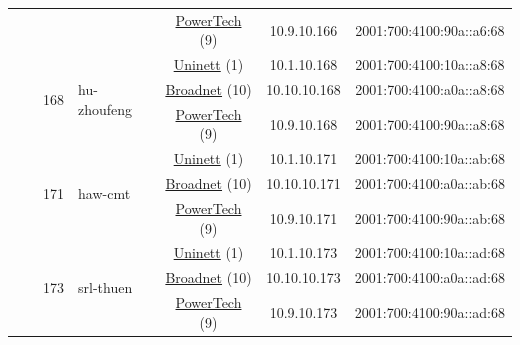 \begin{small}
\begin{center}
\begin{longtable}{|c|c|c|c|c|c|c|c|}
  &  &  &  & \multicolumn{2}{|c|}{\tiny{\href{http://www.powertech.no}{PowerTech} (9)}} & \tiny{10.9.10.166} & \tiny{2001:700:4100:90a::a6:68} \\* \cline{3-3}\cline{4-4}\cline{5-5}\cline{6-6}\cline{7-7}\cline{8-8}
  &  & \multirow{3}{*}{\tiny{168}} & \multicolumn{1}{|l|}{\multirow{3}{*}{\tiny{hu-zhoufeng}}} & \multicolumn{2}{|c|}{\tiny{\href{https://www.uninett.no}{Uninett} (1)}} & \tiny{10.1.10.168} & \tiny{2001:700:4100:10a::a8:68} \\* \cline{5-5}\cline{6-6}\cline{7-7}\cline{8-8}
  &  &  &  & \multicolumn{2}{|c|}{\tiny{\href{https://www.broadnet.no}{Broadnet} (10)}} & \tiny{10.10.10.168} & \tiny{2001:700:4100:a0a::a8:68} \\* \cline{5-5}\cline{6-6}\cline{7-7}\cline{8-8}
  &  &  &  & \multicolumn{2}{|c|}{\tiny{\href{http://www.powertech.no}{PowerTech} (9)}} & \tiny{10.9.10.168} & \tiny{2001:700:4100:90a::a8:68} \\* \cline{3-3}\cline{4-4}\cline{5-5}\cline{6-6}\cline{7-7}\cline{8-8}
  &  & \multirow{3}{*}{\tiny{171}} & \multicolumn{1}{|l|}{\multirow{3}{*}{\tiny{haw-cmt}}} & \multicolumn{2}{|c|}{\tiny{\href{https://www.uninett.no}{Uninett} (1)}} & \tiny{10.1.10.171} & \tiny{2001:700:4100:10a::ab:68} \\* \cline{5-5}\cline{6-6}\cline{7-7}\cline{8-8}
  &  &  &  & \multicolumn{2}{|c|}{\tiny{\href{https://www.broadnet.no}{Broadnet} (10)}} & \tiny{10.10.10.171} & \tiny{2001:700:4100:a0a::ab:68} \\* \cline{5-5}\cline{6-6}\cline{7-7}\cline{8-8}
  &  &  &  & \multicolumn{2}{|c|}{\tiny{\href{http://www.powertech.no}{PowerTech} (9)}} & \tiny{10.9.10.171} & \tiny{2001:700:4100:90a::ab:68} \\* \cline{3-3}\cline{4-4}\cline{5-5}\cline{6-6}\cline{7-7}\cline{8-8}
  &  & \multirow{3}{*}{\tiny{173}} & \multicolumn{1}{|l|}{\multirow{3}{*}{\tiny{srl-thuen}}} & \multicolumn{2}{|c|}{\tiny{\href{https://www.uninett.no}{Uninett} (1)}} & \tiny{10.1.10.173} & \tiny{2001:700:4100:10a::ad:68} \\* \cline{5-5}\cline{6-6}\cline{7-7}\cline{8-8}
  &  &  &  & \multicolumn{2}{|c|}{\tiny{\href{https://www.broadnet.no}{Broadnet} (10)}} & \tiny{10.10.10.173} & \tiny{2001:700:4100:a0a::ad:68} \\* \cline{5-5}\cline{6-6}\cline{7-7}\cline{8-8}
  &  &  &  & \multicolumn{2}{|c|}{\tiny{\href{http://www.powertech.no}{PowerTech} (9)}} & \tiny{10.9.10.173} & \tiny{2001:700:4100:90a::ad:68} \\* \cline{3-3}\cline{4-4}\cline{5-5}\cline{6-6}\cline{7-7}\cline{8-8}

\end{longtable}
\end{center}
\end{small}
